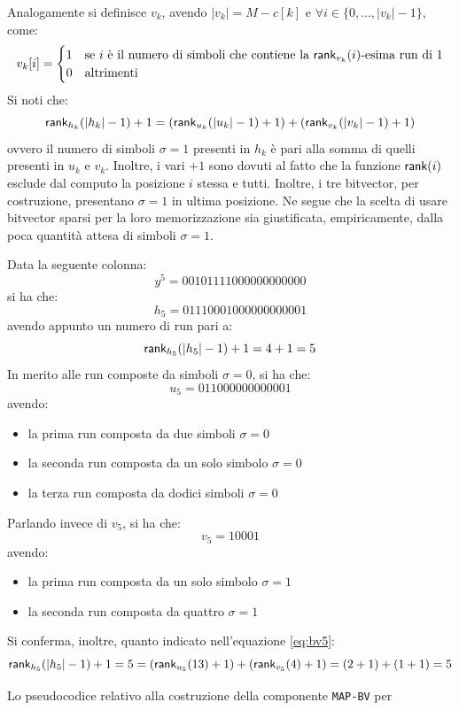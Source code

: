 Analogamente si definisce $v_k$, avendo $|v_k|=M-c[k]$ e $\forall
i\in\{0,\ldots,|v_k|-1\}$, come: 
\begin{equation}
  \label{eq:bv4}
  v_k[i]=
  \begin{cases}
    1&\mbox{se }i \mbox{ è il numero di simboli che contiene la
    }\mbox{\rm {\sf rank}}_{v_k}(i)\mbox{-esima run di 1}\\
    0&\mbox{altrimenti}
  \end{cases}
\end{equation}
Si noti che:
\begin{equation}
  \label{eq:bv5}
  \mbox{\rm {\sf rank}}_{h_k}(|h_k|-1)+1=(\mbox{\rm {\sf rank}}_{u_k}(|u_k|-1)+1)+(\mbox{\rm {\sf rank}}_{v_k}(|v_k|-1)+1)
\end{equation}
ovvero il numero di simboli
$\sigma=1$ presenti in $h_k$ è pari alla somma di quelli presenti in
$u_k$ e $v_k$. Inoltre, i vari $+1$ sono
dovuti al fatto che la funzione 
$\mbox{\rm {\sf rank}}(i)$ esclude dal computo la posizione $i$ stessa e tutti. Inoltre, i tre 
bitvector, 
per costruzione, presentano $\sigma=1$ in ultima posizione. Ne segue che
la scelta di 
usare bitvector sparsi per la loro memorizzazione sia giustificata,
empiricamente, dalla poca quantità attesa di simboli $\sigma=1$.
\begin{esempio}
  \label{es:bv1}
  Data la seguente colonna:
  \[y^5=00101111000000000000\]
  si ha che:
  \[h_5=01110001000000000001\]
  avendo appunto un numero di run pari a:
  \[\mbox{\rm {\sf rank}}_{h_5}(|h_5|-1)+1=4+1=5\]
  In merito alle run composte da simboli $\sigma=0$, si ha che:
  \[u_5=011000000000001\]
  avendo:
  \begin{itemize}
    \item la prima run composta da due simboli $\sigma=0$
    \item la seconda run composta da un solo simbolo $\sigma=0$
    \item la terza run composta da dodici simboli $\sigma=0$
  \end{itemize}
  Parlando invece di $v_5$, si ha che:
  \[v_5=10001\]
  avendo:
  \begin{itemize}
    \item la prima run composta da un solo simbolo $\sigma=1$
    \item la seconda run composta da quattro $\sigma=1$
  \end{itemize}
  Si conferma, inoltre, quanto indicato nell'equazione \ref{eq:bv5}:
  \[\mbox{\rm {\sf rank}}_{h_5}(|h_5|-1)+1=5 =
    (\mbox{\rm {\sf rank}}_{u_5}(13)+1)+(\mbox{\rm {\sf rank}}_{v_5}(4)+1)=(2+1)+(1+1)=5\] 
\end{esempio}
Lo pseudocodice relativo alla costruzione della componente \texttt{MAP-BV} per
